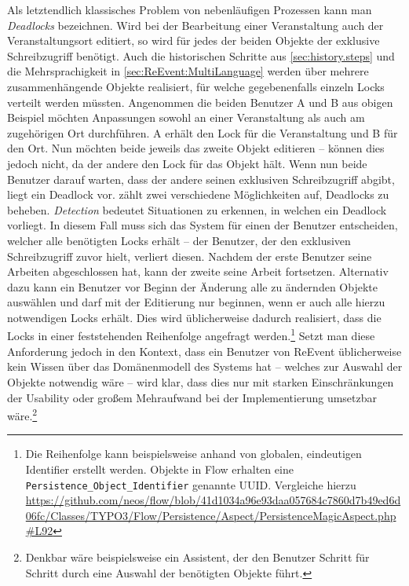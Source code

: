 \begin{appendices}
Als letztendlich klassisches Problem von nebenläufigen Prozessen kann man \emph{Deadlocks} bezeichnen. Wird bei der Bearbeitung einer Veranstaltung auch der Veranstaltungsort editiert, so wird für jedes der beiden Objekte der exklusive Schreibzugriff benötigt. Auch die historischen Schritte aus \ref{sec:history.steps} und die Mehrsprachigkeit in \ref{sec:ReEvent:MultiLanguage} werden über mehrere zusammenhängende Objekte realisiert, für welche gegebenenfalls einzeln Locks verteilt werden müssten. Angenommen die beiden Benutzer A und B aus obigen Beispiel möchten Anpassungen sowohl an einer Veranstaltung als auch am zugehörigen Ort durchführen. A erhält den Lock für die Veranstaltung und B für den Ort. Nun möchten beide jeweils das zweite Objekt editieren -- können dies jedoch nicht, da der andere den Lock für das Objekt hält. Wenn nun beide Benutzer darauf warten, dass der andere seinen exklusiven Schreibzugriff abgibt, liegt ein Deadlock vor. \cite[S. 314]{Harrington.2009} zählt zwei verschiedene Möglichkeiten auf, Deadlocks zu beheben. \emph{Detection} bedeutet Situationen zu erkennen, in welchen ein Deadlock vorliegt. In diesem Fall muss sich das System für einen der Benutzer entscheiden, welcher alle benötigten Locks erhält -- der Benutzer, der den exklusiven Schreibzugriff zuvor hielt, verliert diesen. Nachdem der erste Benutzer seine Arbeiten abgeschlossen hat, kann der zweite seine Arbeit fortsetzen. Alternativ dazu kann ein Benutzer vor Beginn der Änderung alle zu ändernden Objekte auswählen und darf mit der Editierung nur beginnen, wenn er auch alle hierzu notwendigen Locks erhält. Dies wird üblicherweise dadurch realisiert, dass die Locks in einer feststehenden Reihenfolge angefragt werden.\footnote{Die Reihenfolge kann beispielsweise anhand von globalen, eindeutigen Identifier erstellt werden. Objekte in Flow erhalten eine \texttt{Persistence\_Object\_Identifier} genannte UUID. Vergleiche hierzu \url{https://github.com/neos/flow/blob/41d1034a96e93daa057684c7860d7b49ed6d06fc/Classes/TYPO3/Flow/Persistence/Aspect/PersistenceMagicAspect.php\#L92}} Setzt man diese Anforderung jedoch in den Kontext, dass ein Benutzer von ReEvent üblicherweise kein Wissen über das Domänenmodell des Systems hat -- welches zur Auswahl der Objekte notwendig wäre -- wird klar, dass dies nur mit starken Einschränkungen der Usability oder großem Mehraufwand bei der Implementierung umsetzbar wäre.\footnote{Denkbar wäre beispielsweise ein Assistent, der den Benutzer Schritt für Schritt durch eine Auswahl der benötigten Objekte führt.}


\end{appendices}
